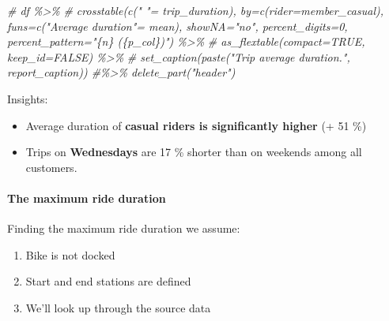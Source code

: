 \documentclass[
]{article}
\newenvironment{Shaded}{\begin{snugshade}}{\end{snugshade}}
\newcommand{\CommentTok}[1]{\textcolor[rgb]{0.56,0.35,0.01}{\textit{#1}}}
\begin{document}
\begin{Shaded}
\begin{Highlighting}[]
\CommentTok{\# df \%\textgreater{}\% }
\CommentTok{\#   crosstable(c(" "= trip\_duration), by=c(rider=member\_casual), funs=c("Average duration"= mean),  showNA="no", percent\_digits=0, percent\_pattern="\{n\} (\{p\_col\})") \%\textgreater{}\% }
\CommentTok{\#   as\_flextable(compact=TRUE, keep\_id=FALSE)  \%\textgreater{}\% }
\CommentTok{\#   set\_caption(paste("Trip average duration.", report\_caption))  \#\%\textgreater{}\% delete\_part("header")}
\end{Highlighting}
\end{Shaded}

Insights:

\begin{itemize}
\item
  Average duration of \textbf{casual riders is significantly higher} (+
  51 \%)
\item
  Trips on \textbf{Wednesdays} are 17 \% shorter than on weekends among
  all customers.
\end{itemize}

\hypertarget{the-maximum-ride-duration}{%
\paragraph{The maximum ride duration}\label{the-maximum-ride-duration}}

Finding the maximum ride duration we assume:

\begin{enumerate}
\def\labelenumi{\arabic{enumi}.}
\item
  Bike is not docked
\item
  Start and end stations are defined
\item
  We'll look up through the source data
\end{enumerate}
\end{document}
